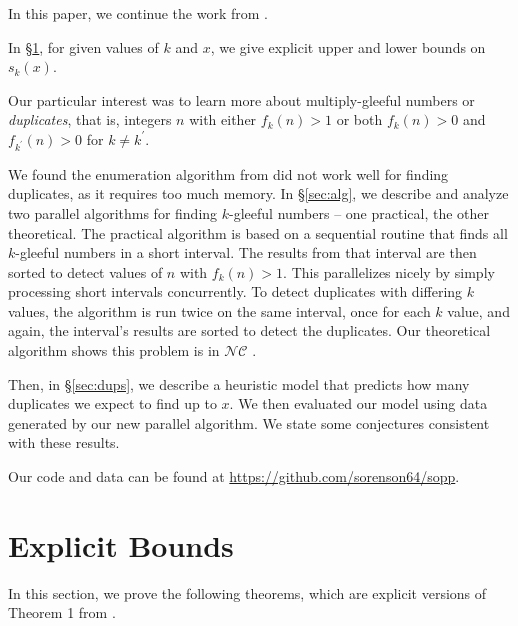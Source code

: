 \documentclass[11pt]{amsart}
\numberwithin{equation}{section}
\numberwithin{algorithm}{section}
\begin{document}
In this paper, we continue the work from \cite{OSS2024}.

In \S\ref{sec:explicit}, for given values of
  $k$ and $x$, we give explicit upper and lower bounds
  on $s_k(x)$.

Our particular interest was to learn more
  about multiply-gleeful numbers or  \textit{duplicates}, 
  that is, integers $n$ with either $f_k(n)>1$
  or both $f_k(n)>0$ and $f_{k^\prime}(n)>0$ for $k\ne k^\prime$.
 
We found the enumeration algorithm from \cite{OSS2024} did not work
  well for finding duplicates, as it requires too much memory.
In \S\ref{sec:alg}, we describe and analyze two parallel
  algorithms for finding $k$-gleeful numbers -- one practical,
  the other theoretical.
The practical algorithm is based on
  a sequential routine that finds all $k$-gleeful numbers in a short interval.
The results from that interval are then sorted to detect
  values of $n$ with $f_k(n)>1$.
This parallelizes nicely by simply processing short intervals
  concurrently.
To detect duplicates with differing $k$ values,
  the algorithm is run twice on the same interval, once for each $k$ value, and again, the interval's results are sorted to detect the duplicates.
Our theoretical algorithm shows this problem is in $\mathcal{NC}$
  \cite{GHR}.

Then, in \S\ref{sec:dups}, we describe a heuristic model
  that predicts how many duplicates we expect to find up to $x$.
We then evaluated our model using data generated by our
  new parallel algorithm.
We state some conjectures consistent with these results.

Our code and data can be found at \url{https://github.com/sorenson64/sopp}.


\section{Explicit Bounds}\label{sec:explicit}
%


\newcommand{\skm}{{s_{k,m}}}
\newcommand{\Sk}{{s_k}}


In this section, we prove the following theorems, 
which are explicit versions of Theorem 1 from \cite{OSS2024}.
\end{document}
